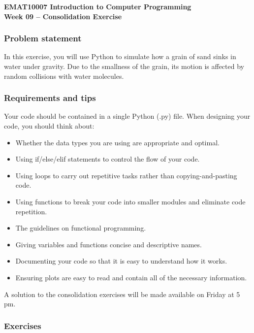 \documentclass[11pt, a4paper]{article}
\begin{document}
\begin{center}
\textbf{EMAT10007 Introduction to Computer Programming \\[0.25em]
Week 09 -- Consolidation Exercise}
\end{center}

\subsubsection*{Problem statement}
In this exercise, you will use Python to simulate how a 
grain of sand sinks in water under gravity.  
Due to the smallness of the grain, its motion is affected by 
random collisions with water molecules.  

\subsubsection*{Requirements and tips}
Your code should be contained in a single Python (.py) file.  
When designing your code, you should think about:
\begin{itemize}
\item{Whether the data types you are using are appropriate and optimal.}
\item{Using if/else/elif statements to control the flow of your code.}
\item{Using loops to carry out repetitive tasks rather than copying-and-pasting code.}
\item{Using functions to break your code into smaller
modules and eliminate code repetition.}
\item{The guidelines on functional programming.}
\item{Giving variables and functions concise and descriptive names.}
\item{Documenting your code so that it is easy to understand how it works.}
\item{Ensuring plots are easy to read and contain all of the necessary information.}
\end{itemize}
A solution to the consolidation exercises will be made available on Friday at 5 pm.  


\subsubsection*{Exercises}
\end{document}
